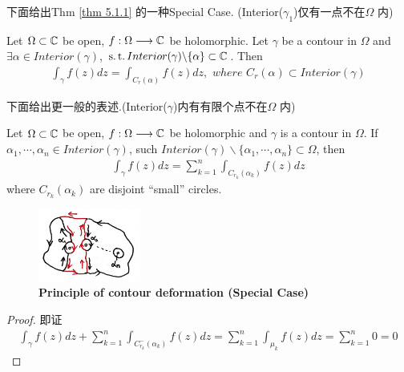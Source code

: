 	\vspace{2em}
	下面给出Thm \ref{thm 5.1.1} 的一种Special Case. (Interior($\gamma_1$)仅有一点不在$\Omega$ 内)
	\begin{corollary}\label{cor 5.1.2}
		Let $\Omega \subset \mathbb{C}$ be open, $f : \Omega \longrightarrow \mathbb{C}$ be holomorphic. Let $\gamma$ be a contour in $\Omega$ and $\exists \alpha \in Interior(\gamma)$, $\operatorname{s.t.} Interior(\gamma) \backslash \{ \alpha \} \subset \mathbb{C}$. Then
		\begin{align}
			\int_{\gamma}{f(z) dz} = \int_{C_{r}(\alpha)}{f(z) dz} , \,\, where \,\, C_{r}(\alpha) \subset Interior(\gamma)
		\end{align}
	\end{corollary}
	
	\vspace{2em}
	下面给出更一般的表述.(Interior($\gamma$)内有有限个点不在$\Omega$ 内)
	\begin{corollary}\label{cor 5.1.3}
		Let $\Omega \subset \mathbb{C}$ be open, $f : \Omega \longrightarrow \mathbb{C}$ be holomorphic and $\gamma$ is a contour in $\Omega$. If $\alpha_1 , \cdots , \alpha_n \in Interior(\gamma)$, such $Interior(\gamma) \backslash \{ \alpha_1 , \cdots , \alpha_n \} \subset \Omega$, then
		\begin{align}
			\int_{\gamma}{f(z) dz} = \sum_{k = 1}^{n}{\int_{C_{r_k}(\alpha_k)}{f(z) dz}} 
		\end{align}
		where $C_{r_k}(\alpha_k)$ are disjoint “small” circles.
		
		\begin{figure}[htbp]  %
			\centering  %
			\includegraphics[width=0.3\textwidth]{figure/5.1-2} %
			\caption{\textbf{Principle of contour deformation (Special Case)}} %
			\label{pic 5.1-2}
		\end{figure}
	
		\begin{proof}
			即证
			\begin{align}
				\int_{\gamma}{f(z) dz} + \sum_{k = 1}^{n}{\int_{C_{r_k}^{-}(\alpha_k)}{f(z) dz}} = \sum_{k = 1}^{n}{\int_{\mu_{k}}{f(z) dz}} = \sum_{k = 1}^{n}{0} = 0
			\end{align}
		\end{proof}
	\end{corollary}

